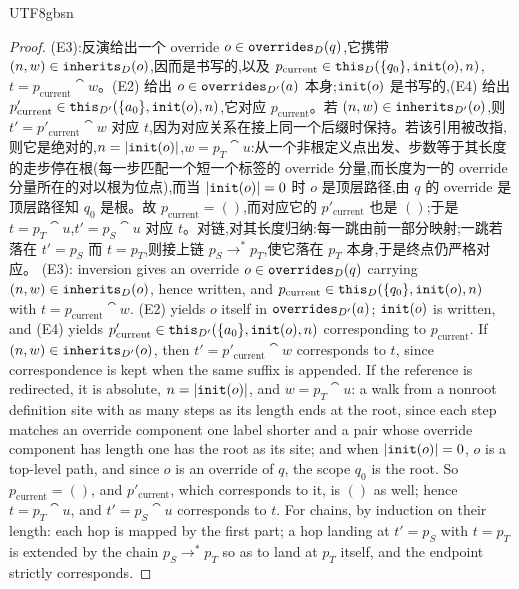 \begin{CJK*}{UTF8}{gbsn}
\begin{proof}
\ifPaperChinese
(E3):反演给出一个 override $o \in \mathtt{overrides}_D(q)$,它携带 $(n, w) \in \mathtt{inherits}_D(o)$,因而是书写的,以及 $p_{\mathrm{current}} \in \mathtt{this}_D(\{q_0\}, \mathtt{init}(o), n)$,$t = p_{\mathrm{current}} \cat w$。(E2) 给出 $o \in \mathtt{overrides}_{D'}(a)$ 本身;$\mathtt{init}(o)$ 是书写的,(E4) 给出 $p'_{\mathrm{current}} \in \mathtt{this}_{D'}(\{a_0\}, \mathtt{init}(o), n)$,它对应 $p_{\mathrm{current}}$。若 $(n, w) \in \mathtt{inherits}_{D'}(o)$,则 $t' = p'_{\mathrm{current}} \cat w$ 对应 $t$,因为对应关系在接上同一个后缀时保持。若该引用被改指,则它是绝对的,$n = |\mathtt{init}(o)|$,$w = p_T \cat u$:从一个非根定义点出发、步数等于其长度的走步停在根(每一步匹配一个短一个标签的 override 分量,而长度为一的 override 分量所在的对以根为位点),而当 $|\mathtt{init}(o)| = 0$ 时 $o$ 是顶层路径,由 $q$ 的 override 是顶层路径知 $q_0$ 是根。故 $p_{\mathrm{current}} = ()$,而对应它的 $p'_{\mathrm{current}}$ 也是 $()$;于是 $t = p_T \cat u$,$t' = p_S \cat u$ 对应 $t$。对链,对其长度归纳:每一跳由前一部分映射;一跳若落在 $t' = p_S$ 而 $t = p_T$,则接上链 $p_S \to^* p_T$,使它落在 $p_T$ 本身,于是终点仍严格对应。
\else
(E3): inversion gives an override $o \in \mathtt{overrides}_D(q)$ carrying $(n, w) \in \mathtt{inherits}_D(o)$, hence
written, and $p_{\mathrm{current}} \in \mathtt{this}_D(\{q_0\}, \mathtt{init}(o), n)$ with
$t = p_{\mathrm{current}} \cat w$. (E2) yields $o$ itself in $\mathtt{overrides}_{D'}(a)$; $\mathtt{init}(o)$ is written,
and (E4) yields $p'_{\mathrm{current}} \in \mathtt{this}_{D'}(\{a_0\}, \mathtt{init}(o), n)$ corresponding to
$p_{\mathrm{current}}$. If $(n, w) \in \mathtt{inherits}_{D'}(o)$, then $t' = p'_{\mathrm{current}} \cat w$
corresponds to $t$, since correspondence is kept when the same suffix is appended. If the reference is
redirected, it is absolute, $n = |\mathtt{init}(o)|$, and $w = p_T \cat u$: a walk from a nonroot definition site
with as many steps as its length ends at the root, since each step matches an override component one
label shorter and a pair whose override component has length one has the root as its site; and when
$|\mathtt{init}(o)| = 0$, $o$ is a top-level path, and since $o$ is an override of $q$, the scope $q_0$ is the
root. So $p_{\mathrm{current}} = ()$, and $p'_{\mathrm{current}}$, which corresponds to it, is $()$ as
well; hence $t = p_T \cat u$, and $t' = p_S \cat u$ corresponds to $t$. For chains, by induction on their
length: each hop is mapped by the first part; a hop landing at $t' = p_S$ with $t = p_T$ is extended by
the chain $p_S \to^* p_T$ so as to land at $p_T$ itself, and the endpoint strictly corresponds.
\fi


\end{proof}
\end{CJK*}
